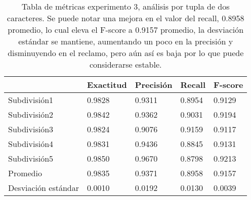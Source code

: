 \begin{table}[h]
    \centering
    \caption{Tabla de métricas experimento 3, análisis por tupla de dos caracteres. Se puede notar una mejora en el valor del recall, 0.8958 promedio, lo cual eleva el F-score a 0.9157 promedio, la desviación estándar se mantiene, aumentando un poco en la precisión y disminuyendo en el reclamo, pero aún así es baja por lo que puede considerarse estable. }
\begin{tabular}{|l|llll|}
\hline
& Exactitud &     Precisión &     Recall  &   F-score \\ \hline
              
Subdivisión1            &       0.9828  &       0.9311  &       0.8954  &       0.9129  \\ 
Subdivisión2            &       0.9842  &       0.9362  &       0.9031  &       0.9194  \\ 
Subdivisión3            &       0.9824  &       0.9076  &       0.9159  &       0.9117  \\ 
Subdivisión4            &       0.9831  &       0.9436  &       0.8845  &       0.9131  \\ 
Subdivisión5            &       0.9850  &       0.9670  &       0.8798  &       0.9213  \\ \hline
Promedio                &       0.9835  &       0.9371  &       0.8958  &       0.9157  \\ \hline
Desviación estándar     &       0.0010  &       0.0192  &       0.0130  &       0.0039  \\ \hline

\end{tabular}
		     \label{tab:exp3}
\end{table}